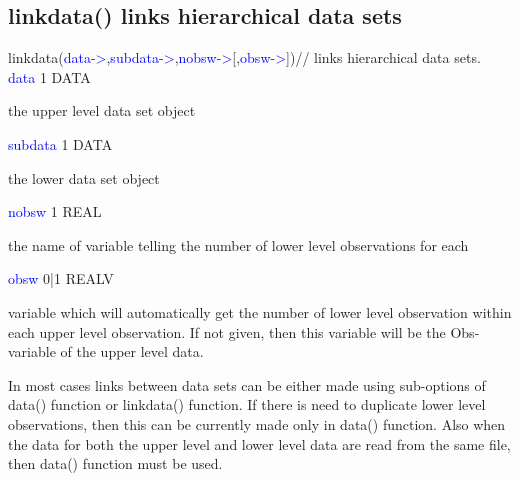 \subsection{\textcolor{VioletRed}{linkdata}() links hierarchical data sets}
\label{linkdata}
\textcolor{VioletRed}{linkdata}(\textcolor{blue}{data->},\textcolor{blue}{subdata->},\textcolor{blue}{nobsw->}[,\textcolor{blue}{obsw->}])//
links hierarchical data sets.
\vspace{0.3cm}
\hline
\vspace{0.3cm}
\noindent \textcolor{blue}{data} \tabto{3cm} 1 \tabto{5cm}  DATA \tabto{7cm}
\begin{changemargin}{3cm}{0cm}
\noindent  the upper level data set object
\end{changemargin}
\vspace{0.3cm}
\hline
\vspace{0.3cm}
\noindent \textcolor{blue}{subdata}  \tabto{3cm} 1 \tabto{5cm}  DATA \tabto{7cm}
\begin{changemargin}{3cm}{0cm}
\noindent  the lower data set object
\end{changemargin}
\vspace{0.3cm}
\hline
\vspace{0.3cm}
\noindent \textcolor{blue}{nobsw} \tabto{3cm} 1 \tabto{5cm}  REAL  \tabto{7cm}
\begin{changemargin}{3cm}{0cm}
\noindent  the name of variable telling the number of lower level observations for each
\end{changemargin}
\vspace{0.3cm}
\hline
\vspace{0.3cm}
\noindent \textcolor{blue}{obsw}  \tabto{3cm}  0|1  \tabto{5cm}  REALV  \tabto{7cm}
\begin{changemargin}{3cm}{0cm}
\noindent variable which will automatically get the number of lower level observation within
each upper level observation. If not given, then this variable will be
the Obs-variable of the upper level data.
\end {changemargin}
\hline
\vspace{0.2cm}
\begin{note}
In most cases links between data sets can be either made using sub-options of \textcolor{VioletRed}{data}()
function or \textcolor{VioletRed}{linkdata}() function. If there is need to duplicate lower level observations, then
this can be currently made only in \textcolor{VioletRed}{data}() function. Also when the data for both the upper
level and lower level data are read from the same file, then \textcolor{VioletRed}{data}() function must be used.
\end{note}

